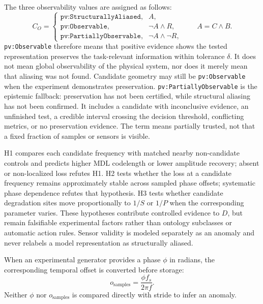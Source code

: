\documentclass[
	letterpaper,
	10pt,
	unnumberedsections,
	twoside,
]{LTJournalArticle}
\newcommand{\valueof}[1]{\texttt{pv:#1}}
\begin{document}
The three observability values are assigned as follows:
\begin{equation}
C_O=
\begin{cases}
\valueof{StructurallyAliased}, & A,\\
\valueof{Observable}, & \neg A\wedge R,\\
\valueof{PartiallyObservable}, & \neg A\wedge\neg R,
\end{cases}
\qquad A=C\wedge B.
\label{eq:observability-state}
\end{equation}
\valueof{Observable} therefore means that positive evidence shows the tested representation preserves the task-relevant information within tolerance $\delta$. It does not mean global observability of the physical system, nor does it merely mean that aliasing was not found. Candidate geometry may still be \valueof{Observable} when the experiment demonstrates preservation. \valueof{PartiallyObservable} is the epistemic fallback: preservation has not been certified, while structural aliasing has not been confirmed. It includes a candidate with inconclusive evidence, an unfinished test, a credible interval crossing the decision threshold, conflicting metrics, or no preservation evidence. The term means partially trusted, not that a fixed fraction of samples or sensors is visible.

H1 compares each candidate frequency with matched nearby non-candidate controls and predicts higher MDL codelength or lower amplitude recovery; absent or non-localized loss refutes H1. H2 tests whether the loss at a candidate frequency remains approximately stable across sampled phase offsets; systematic phase dependence refutes that hypothesis. H3 tests whether candidate degradation sites move proportionally to $1/S$ or $1/P$ when the corresponding parameter varies. These hypotheses contribute controlled evidence to $D$, but remain falsifiable experimental factors rather than ontology subclasses or automatic action rules. Sensor validity is modeled separately as an anomaly and never relabels a model representation as structurally aliased.

When an experimental generator provides a phase $\phi$ in radians, the corresponding temporal offset is converted before storage:
\begin{equation}
o_{\mathrm{samples}}=\frac{\phi f_s}{2\pi f}.
\label{eq:phase-conversion}
\end{equation}
Neither $\phi$ nor $o_{\mathrm{samples}}$ is compared directly with stride to infer an anomaly.
\end{document}
